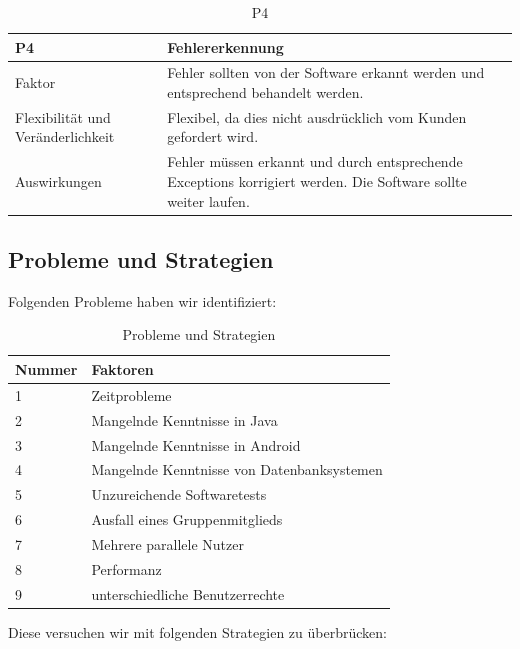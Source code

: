 \documentclass[fontsize=12pt,paper=a4,twoside]{scrartcl}
\begin{document}
\begin{table}[H]
\caption{P4}
\begin{tabular}{|p{3cm}|p{12cm}|}\hline
\textbf{P4} &  \textbf{Fehlererkennung} \\ \hline \hline
Faktor & Fehler sollten von der Software erkannt werden und entsprechend behandelt werden.\\ \hline
Flexibilität und Veränderlichkeit & Flexibel, da dies nicht ausdrücklich vom Kunden gefordert wird.\\ \hline
Auswirkungen & Fehler müssen erkannt und durch entsprechende Exceptions korrigiert werden. Die Software sollte weiter laufen.  \\ \hline
\end{tabular}
\end{table}

\newpage

\subsection{Probleme und Strategien}
\label{sec:strategien}

Folgenden Probleme haben wir identifiziert:\\

\begin{table}[H]
\centering
\caption{Probleme und Strategien}
\begin{tabular}{|l|l|}\hline
\textbf{Nummer} & \textbf{Faktoren}\\ \hline \hline
1 & Zeitprobleme\\ \hline
2 & Mangelnde Kenntnisse in Java\\ \hline
3 & Mangelnde Kenntnisse in Android\\ \hline
4 & Mangelnde Kenntnisse von Datenbanksystemen\\ \hline
5 & Unzureichende Softwaretests\\ \hline
6 & Ausfall eines Gruppenmitglieds\\ \hline
7 & Mehrere parallele Nutzer\\ \hline
8 & Performanz\\ \hline
9 & unterschiedliche Benutzerrechte\\ \hline
\end{tabular}
\end{table}

Diese versuchen wir mit folgenden Strategien zu überbrücken:
\end{document}
